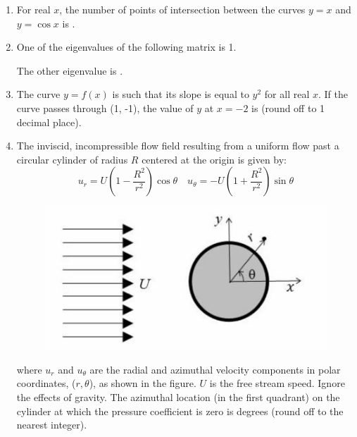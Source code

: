 \documentclass{article}
\begin{document}
\begin{enumerate}[leftmargin=*, resume]
\item For real \( x \), the number of points of intersection between the curves \( y = x \) and \( y = \cos x \) is \underline{\hspace{1.5cm}}.

\item One of the eigenvalues of the following matrix is 1.

The other eigenvalue is \underline{\hspace{1.5cm}}.

\item The curve \( y = f(x) \) is such that its slope is equal to \( y^2 \) for all real \( x \). If the curve passes through (1, -1), the value of \( y \) at \( x = -2 \) is \underline{\hspace{1.5cm}} (round off to 1 decimal place).

\item The inviscid, incompressible flow field resulting from a uniform flow past a circular cylinder of radius \( R \) centered at the origin is given by:
\[
u_r = U \left( 1 - \frac{R^2}{r^2} \right) \cos \theta \quad u_\theta = -U \left( 1 + \frac{R^2}{r^2} \right) \sin \theta
\]
\begin{figure}[H]
    \centering
    \includegraphics[width=0.3\linewidth]{figs/q41.png}
    \caption{}
    \label{fig:q41}
\end{figure}
where \( u_r \) and \( u_\theta \) are the radial and azimuthal velocity components in polar coordinates, (\( r, \theta \)), as shown in the figure. \( U \) is the free stream speed. Ignore the effects of gravity. The azimuthal location (in the first quadrant) on the cylinder at which the pressure coefficient is zero is \underline{\hspace{1.5cm}} degrees (round off to the nearest integer).


\end{enumerate}
\end{document}
